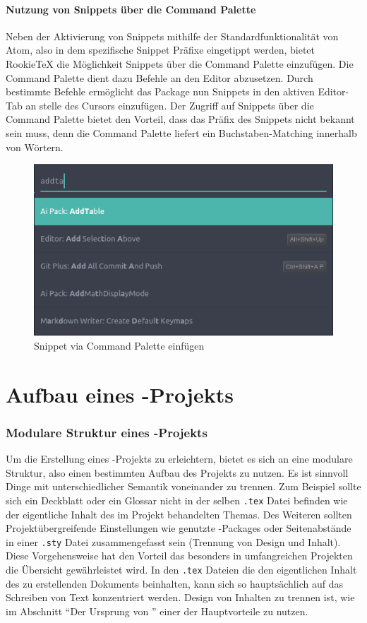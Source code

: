         \subsection{Nutzung von Snippets über die Command Palette}
            Neben der Aktivierung von Snippets mithilfe der Standardfunktionalität von Atom, also in dem spezifische Snippet Präfixe eingetippt werden, bietet RookieTeX die Möglichkeit Snippets über die Command Palette einzufügen. Die Command Palette dient dazu Befehle an den Editor abzusetzen. Durch bestimmte Befehle ermöglicht das Package nun \latex Snippets in den aktiven Editor-Tab an stelle des Cursors einzufügen. Der Zugriff auf Snippets über die Command Palette bietet den Vorteil, dass das Präfix des Snippets nicht bekannt sein muss, denn die Command Palette liefert ein Buchstaben-Matching innerhalb von Wörtern.
            \begin{figure}[H]
                \centering
                    \includegraphics[scale=0.7]{img/snippets_via_cp.png}
                    \caption{Snippet via Command Palette einfügen}
            \end{figure}

\part{Aufbau eines \tex-Projekts}
    \section{Modulare Struktur eines \tex-Projekts}
    Um die Erstellung eines \tex-Projekts zu erleichtern, bietet es sich an eine modulare Struktur, also einen bestimmten Aufbau des Projekts zu nutzen. Es ist sinnvoll Dinge mit unterschiedlicher Semantik voneinander zu trennen. Zum Beispiel sollte sich ein Deckblatt oder ein Glossar nicht in der selben \texttt{.tex} Datei befinden wie der eigentliche Inhalt des im Projekt behandelten Themas. Des Weiteren sollten Projektübergreifende Einstellungen wie genutzte \latex-Packages oder Seitenabstände in einer \texttt{.sty} Datei zusammengefasst sein (Trennung von Design und Inhalt). Diese Vorgehensweise hat den Vorteil das besonders in umfangreichen Projekten die Übersicht gewährleistet wird. In den \texttt{.tex} Dateien die den eigentlichen Inhalt des zu erstellenden Dokuments beinhalten, kann sich so hauptsächlich auf das Schreiben von Text konzentriert werden. Design von Inhalten zu trennen ist, wie im Abschnitt "`Der Ursprung von \latex"' einer der Hauptvorteile \latex zu nutzen.

